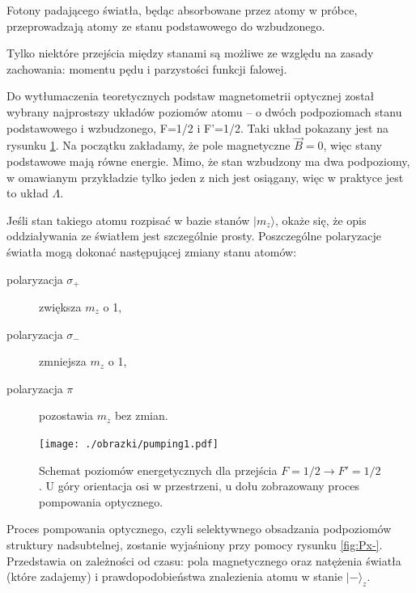 \documentclass[a4paper,10pt,twoside]{report}
\begin{document}
Fotony padającego światła, będąc absorbowane przez atomy w próbce, przeprowadzają atomy ze stanu podstawowego do wzbudzonego.

Tylko niektóre przejścia między stanami są możliwe ze względu na zasady zachowania: momentu pędu i parzystości funkcji falowej. 

Do wytłumaczenia teoretycznych podstaw magnetometrii optycznej został wybrany najprostszy układów poziomów atomu -- o dwóch podpoziomach stanu podstawowego i wzbudzonego, F=1/2 i F'=1/2.
Taki układ pokazany jest na rysunku \ref{poziomyL}. Na początku zakładamy, że pole magnetyczne $\vec B=0$, więc stany podstawowe mają równe energie.
 Mimo, że stan wzbudzony ma dwa podpoziomy, w omawianym przykładzie tylko jeden z nich jest osiągany, więc w praktyce jest to układ $\Lambda$.

Jeśli stan takiego atomu rozpisać w bazie stanów $\lvert m_z \rangle$, okaże się, że opis oddziaływania ze światłem jest szczególnie prosty. Poszczególne polaryzacje światła mogą dokonać następującej zmiany stanu atomów:
\begin{center}
\begin{description}
\item[polaryzacja $\sigma_+$] zwiększa $m_z$ o 1,
\item[polaryzacja $\sigma_-$] zmniejsza $m_z$ o 1,
\item[polaryzacja $\pi$] pozostawia $m_z$ bez zmian.
\end{description}
\end{center}


\begin{figure}[h!]
\begin{center}
 \texttt{[image: ./obrazki/pumping1.pdf]}
\end{center}
\caption{ Schemat poziomów energetycznych dla przejścia $F=1/2 \rightarrow F'=1/2$. U góry orientacja osi w przestrzeni, u dołu zobrazowany proces pompowania optycznego.}
\label{poziomyL}
\end{figure}

Proces pompowania optycznego, czyli selektywnego obsadzania podpoziomów struktury nadsubtelnej, zostanie wyjaśniony przy pomocy rysunku \ref{fig:Px-}. Przedstawia on zależności od czasu: pola magnetycznego oraz natężenia światła (które zadajemy) i prawdopodobieństwa znalezienia atomu w stanie $\lvert - \rangle_z$.
\end{document}
